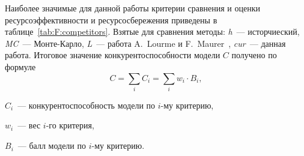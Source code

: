 Наиболее значимые для данной работы критерии сравнения и оценки ресурсоэффективности и ресурсосбережения приведены в таблице~\ref{tab:F:competitors}.
Взятые для сравнения методы: \textit{h}~--- исторчиеский, \textit{MC}~--- Монте-Карло, \textit{L}~--- работа A.~Lourme и F.~Maurer~\cite{Lourme2016}, \textit{cur}~--- данная работа.
Итоговое значение конкурентоспособности модели $C$ получено по формуле
\begin{equation} C = \sum_i C_i = \sum_i w_i \cdot B_i, \end{equation}
\begin{where}
    \item $C_i$~--- конкурентоспособность модели по $i$-му критерию, 
    \item $w_i$~--- вес $i$-го критерия, 
    \item $B_i$~--- балл модели по $i$-му критерию.
\end{where}

